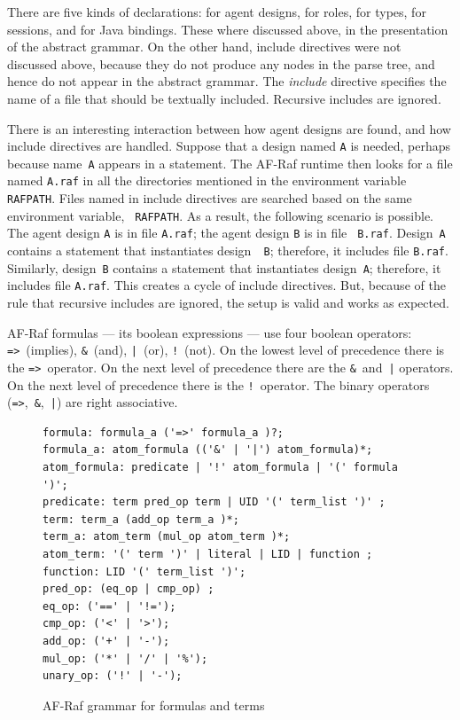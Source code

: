 \documentclass[a4paper,12pt,oneside,fleqn]{book} %
\begin{document}
There are five kinds of declarations: for agent designs, for roles, for
types, for sessions, and for Java bindings. These where discussed above, in
the presentation of the abstract grammar. On the other hand, include
directives were not discussed above, because they do not produce any nodes
in the parse tree, and hence do not appear in the abstract grammar.  The
{\it include} directive specifies the name of a file that should be
textually included. Recursive includes are ignored.

There is an interesting interaction between how agent designs are found,
and how include directives are handled. Suppose that a design named {\tt A}
is needed, perhaps because name~{\tt A} appears in a statement. The AF-Raf
runtime then looks for a file named {\tt A.raf} in all the directories
mentioned in the environment variable {\tt RAFPATH}. Files named in include
directives are searched based on the same environment variable, {\tt
RAFPATH}. As a result, the following scenario is possible. The agent design
{\tt A} is in file {\tt A.raf}; the agent design {\tt B} is in file {\tt
B.raf}. Design~{\tt A} contains a statement that instantiates design~{\tt
B}; therefore, it includes file {\tt B.raf}. Similarly, design~{\tt B}
contains a statement that instantiates design~{\tt A}; therefore, it
includes file {\tt A.raf}. This creates a cycle of include directives.
But, because of the rule that recursive includes are ignored, the setup is
valid and works as expected.

AF-Raf formulas --- its boolean expressions --- use four boolean operators:
\verb+=>+~(implies), \verb+&+~(and), \verb+|+~(or), \verb+!+~(not).  On the
lowest level of precedence there is the \verb+=>+~operator.  On the next
level of precedence there are the \verb+&+~and~\verb+|+ operators. On the
next level of precedence there is the \verb+!+~operator.  The binary
operators (\verb+=>+,~\verb+&+,~\verb+|+) are right associative.

\begin{figure}\footnotesize %
\begin{verbatim}
formula: formula_a ('=>' formula_a )?;
formula_a: atom_formula (('&' | '|') atom_formula)*;
atom_formula: predicate | '!' atom_formula | '(' formula ')';
predicate: term pred_op term | UID '(' term_list ')' ;
term: term_a (add_op term_a )*;
term_a: atom_term (mul_op atom_term )*;
atom_term: '(' term ')' | literal | LID | function ;
function: LID '(' term_list ')';
pred_op: (eq_op | cmp_op) ;
eq_op: ('==' | '!=');
cmp_op: ('<' | '>');
add_op: ('+' | '-');
mul_op: ('*' | '/' | '%');
unary_op: ('!' | '-');
\end{verbatim}
\caption{AF-Raf grammar for formulas and terms}
\label{fig:grammar-expr}
\end{figure} %
\end{document}
